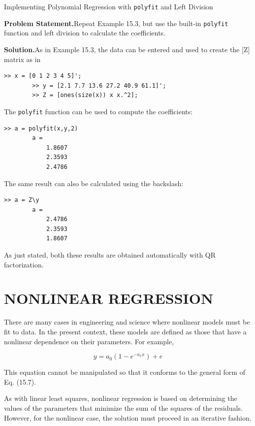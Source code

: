 \documentclass[../main.tex]{subfiles}
\begin{document}
\begin{example} Implementing Polynomial Regression with \texttt{polyfit} and Left Division

    \textbf{Problem Statement.}\quad Repeat Example 15.3, but use the built-in \texttt{polyfit} function and
	left division to calculate the coefficients.

	\noindent\textbf{Solution.}\quad As in Example 15.3, the data can be entered and used to create the [Z] matrix
	as in

	\begin{lstlisting}[numbers=none]
		>> x = [0 1 2 3 4 5]';
		>> y = [2.1 7.7 13.6 27.2 40.9 61.1]';
		>> Z = [ones(size(x)) x x.^2];
	\end{lstlisting}

	\noindent The \texttt{polyfit} function can be used to compute the coefficients:

	\begin{lstlisting}[numbers=none]
		>> a = polyfit(x,y,2)
		a =
			1.8607
			2.3593
			2.4786
	\end{lstlisting}

	The same result can also be calculated using the backslash:

	\begin{lstlisting}[numbers=none]
		>> a = Z\y
		a =
			2.4786
			2.3593
			1.8607	
	\end{lstlisting}

	\noindent As just stated, both these results are obtained automatically with QR factorization.
\end{example}

\bigskip
\label{cha:cha_P_15_5} %
\section{NONLINEAR REGRESSION}

\noindent There are many cases in engineering and science where nonlinear models must be fit to
data. In the present context, these models are defined as those that have a nonlinear dependence on their parameters. For example,

\begin{equation}
	\tag{15.12}
	y = a_0 (1 - e^{-a_1 x}) + e
\end{equation}

\noindent This equation cannot be manipulated so that it conforms to the general form of Eq. (15.7).

As with linear least squares, nonlinear regression is based on determining the values
of the parameters that minimize the sum of the squares of the residuals. However, for the
nonlinear case, the solution must proceed in an iterative fashion.
\end{document}

